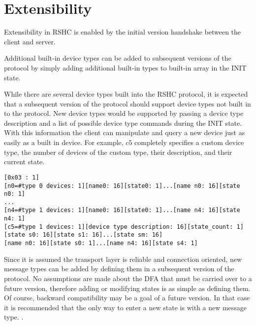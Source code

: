 \section{Extensibility}
\label{sec:extend}

Extensibility in RSHC is enabled by the initial version handshake between the client and server.

Additional built-in device types can be added to subsequent versions of the protocol by simply adding additional built-in types to built-in array in the INIT state.  

While there are several device types built into the RSHC protocol, it is expected that a subsequent version of the protocol should support device types not built in to the protocol.  New device types would be supported by passing a device type description and a list of possible device type commands during the INIT state.  With this information the client can manipulate and query a new device just as easily as a built in device.  For example, $c5$ completely specifies a custom device type, the number of devices of the custom type, their description, and their current state.

\begin{verbatim}
[0x03 : 1]
[n0=#type 0 devices: 1][name0: 16][state0: 1]...[name n0: 16][state n0: 1]
...
[n4=#type 1 devices: 1][name0: 16][state0: 1]...[name n4: 16][state n4: 1]
[c5=#type 1 devices: 1][device type description: 16][state_count: 1]
[state s0: 16][state s1: 16]...[state sm: 16]
[name n0: 16][state s0: 1]...[name n4: 16][state s4: 1]
\end{verbatim}

Since it is assumed the transport layer is reliable and connection oriented, new message types can be added by defining them in a subsequent version of the protocol.  No assumptions are made about the DFA that must be carried over to a future version, therefore adding or modifying states is as simple as defining them.  Of course, backward compatibility may be a goal of a future version.  In that case it is recommended that the only way to enter a new state is with a new message type.
.  



